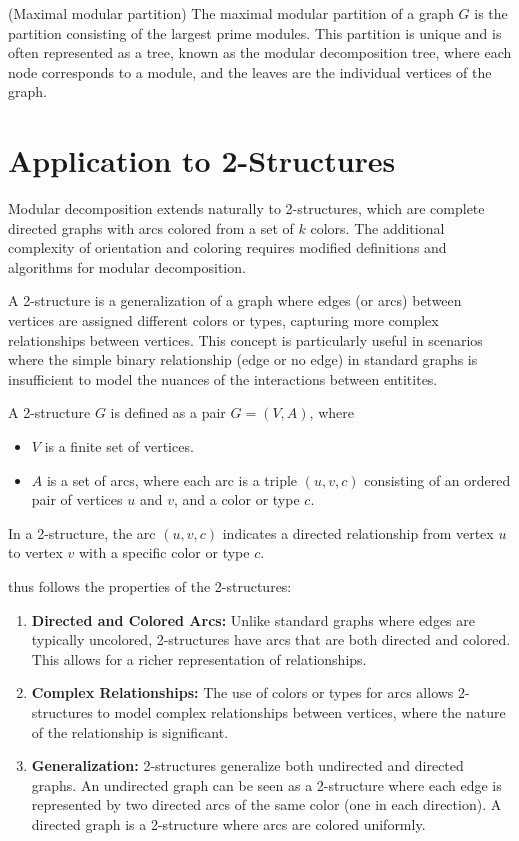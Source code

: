 \begin{mydef}
(Maximal modular partition)
    The maximal modular partition of a graph $G$ is the partition consisting of the largest prime modules.
    This partition is unique and is often represented as a tree, known as the modular decomposition tree, where each node corresponds to a module, and the leaves are the individual vertices of the graph.
\end{mydef}


\section{Application to 2-Structures}\label{sec:application-to-2-structures}

Modular decomposition extends naturally to 2-structures, which are complete directed graphs with arcs colored from a set of $k$ colors.
The additional complexity of orientation and coloring requires modified definitions and algorithms for modular decomposition.

A 2-structure is a generalization of a graph where edges (or arcs) between vertices are assigned different colors or types, capturing more complex relationships between vertices.
This concept is particularly useful in scenarios where the simple binary relationship (edge or no edge) in standard graphs is insufficient to model the nuances of the interactions between entitites.

\begin{mydef}
    A 2-structure $G$ is defined as a pair $G = (V, A)$, where
    \begin{itemize}
        \item $V$ is a finite set of vertices.
        \item $A$ is a set of arcs, where each arc is a triple $(u, v, c)$ consisting of an ordered pair of vertices $u$ and $v$, and a color or type $c$.
    \end{itemize}
\end{mydef}

In a 2-structure, the arc $(u, v, c)$ indicates a directed relationship from vertex $u$ to vertex $v$ with a specific color or type $c$.

thus follows the properties of the 2-structures:

\begin{enumerate}
    \item \textbf{Directed and Colored Arcs:} Unlike standard graphs where edges are typically uncolored, 2-structures have arcs that are both directed and colored.
    This allows for a richer representation of relationships.
    \item \textbf{Complex Relationships:} The use of colors or types for arcs allows 2-structures to model complex relationships between vertices, where the nature of the relationship is significant.
    \item \textbf{Generalization:} 2-structures generalize both undirected and directed graphs.
    An undirected graph can be seen as a 2-structure where each edge is represented by two directed arcs of the same color (one in each direction).
    A directed graph is a 2-structure where arcs are colored uniformly.
\end{enumerate}


